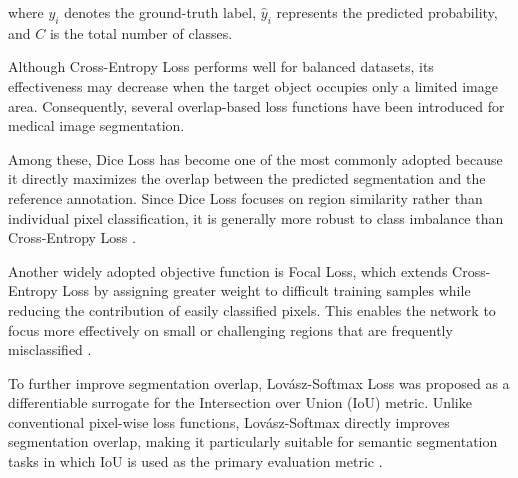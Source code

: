 where $y_i$ denotes the ground-truth label, $\hat{y}_i$ represents the predicted probability, and $C$ is the total number of classes.

Although Cross-Entropy Loss performs well for balanced datasets, its effectiveness may decrease when the target object occupies only a limited image area. Consequently, several overlap-based loss functions have been introduced for medical image segmentation.

Among these, Dice Loss has become one of the most commonly adopted because it directly maximizes the overlap between the predicted segmentation and the reference annotation. Since Dice Loss focuses on region similarity rather than individual pixel classification, it is generally more robust to class imbalance than Cross-Entropy Loss \citep{Milletari2016}.

Another widely adopted objective function is Focal Loss, which extends Cross-Entropy Loss by assigning greater weight to difficult training samples while reducing the contribution of easily classified pixels. This enables the network to focus more effectively on small or challenging regions that are frequently misclassified \citep{Lin2017}.

To further improve segmentation overlap, Lov\'asz-Softmax Loss was proposed as a differentiable surrogate for the Intersection over Union (IoU) metric. Unlike conventional pixel-wise loss functions, Lov\'asz-Softmax directly improves segmentation overlap, making it particularly suitable for semantic segmentation tasks in which IoU is used as the primary evaluation metric \citep{Berman2018}.

